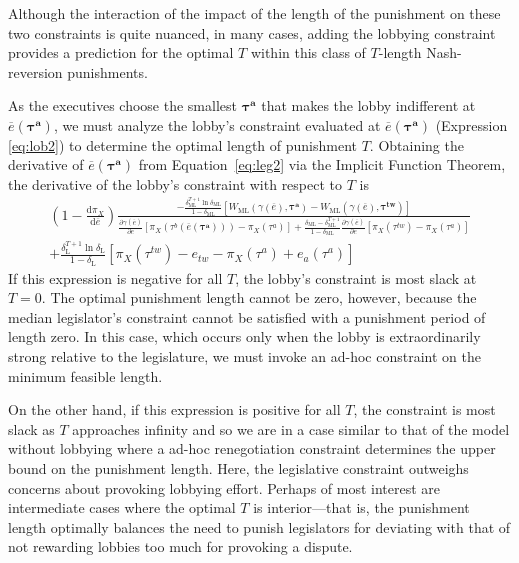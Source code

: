 \documentclass[authoryear, review]{elsarticle}
\newcommand{\ov}{\overline}
\newcommand{\bta}{\bm{\tau^a}}
\newcommand{\ga}{\gamma}
\newcommand{\btw}{\bm{\tau^{tw}}}
\newcommand{\de}{\delta}
\begin{document}
Although the interaction of the impact of the length of the punishment on these two constraints is quite nuanced, in many cases, adding the lobbying constraint provides a prediction for the optimal $T$ within this class of $T$-length Nash-reversion punishments.

As the executives choose the smallest $\bta$ that makes the lobby indifferent at $\ov{e}(\bta)$, we must analyze the lobby's constraint evaluated at $\ov{e}(\bta)$ (Expression \ref{eq:lob2}) to determine the optimal length of punishment $T$. Obtaining the derivative of $\ov{e}(\bta)$ from Equation~\ref{eq:leg2} via the Implicit Function Theorem, the derivative of the lobby's constraint with respect to $T$ is
\begin{multline}
 	\left(1 - \frac{\mathrm{d} \pi_X}{\mathrm{d} \ov{e}} \right) \frac{ -\frac{\de_\text{ML}^{T+1}\ln\de_\text{ML}}{1-\de_\text{ML}}\left[  W_\text{ML}(\ga(\ov{e}),\bta) - W_\text{ML}(\ga(\ov{e}),\btw) \right]}{\frac{\partial \ga(\ov{e})}{\partial e} \left[ \pi_X(\tau^b(\ov{e}(\bta))) - \pi_X(\tau^a) \right] + \frac{\de_\text{ML} - \de_\text{ML}^{T+1}}{1-\de_\text{ML}}\frac{\partial \ga(\ov{e})}{\partial e} \left[ \pi_X(\tau^{tw}) - \pi_X(\tau^a) \right]} \\
	+  \frac{\de_\text{L}^{T+1} \ln \de_\text{L}}{1-\de_\text{L}} \left[ \pi_X(\tau^{tw}) - e_{tw} -\pi_X(\tau^a) + e_a(\tau^a) \right]
 	\label{ine:T}
\end{multline}
If this expression is negative for all $T$, the lobby's constraint is most slack at $T=0$. The optimal punishment length cannot be zero, however, because the median legislator's constraint cannot be satisfied with a punishment period of length zero. In this case, which occurs only when the lobby is extraordinarily strong relative to the legislature, we must invoke an ad-hoc constraint on the minimum feasible length.

On the other hand, if this expression is positive for all $T$, the constraint is most slack as $T$ approaches infinity and so we are in a case similar to that of the model without lobbying where a ad-hoc renegotiation constraint determines the upper bound on the punishment length. Here, the legislative constraint outweighs concerns about provoking lobbying effort. Perhaps of most interest are intermediate cases where the optimal $T$ is interior---that is, the punishment length optimally balances the need to punish legislators for deviating with that of not rewarding lobbies too much for provoking a dispute.
\end{document}
